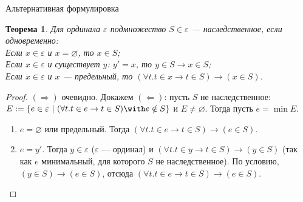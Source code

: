 \documentclass[aspectratio=169]{beamer}
\newtheorem{thm}{Теорема}[section]
\begin{document}
\begin{frame}{Альтернативная формулировка}
\begin{thm}Для ординала $\varepsilon$ подмножество $S \in \varepsilon$ --- наследственное, %
если одновременно:\\
Если $x \in \varepsilon$ и $x = \varnothing$, то $x \in S$;\\
Если $x \in \varepsilon$ и существует $y$: $y' = x$, то $y \in S \rightarrow x \in S$;\\
Если $x \in \varepsilon$ и $x$ --- предельный, то $(\forall t.t \in x \rightarrow t \in S) \rightarrow (x \in S)$.
\end{thm}

\begin{proof}$(\Rightarrow)$ очевидно. \pause Докажем $(\Leftarrow)$: пусть $S$ не наследственное: 
$E := \{e \in \varepsilon \ |\  (\forall t.t \in e \rightarrow t \in S) \with e \notin S \}$
и $E \ne \varnothing$. Тогда пусть $e = \min E$. %

\begin{enumerate}
\item $e = \varnothing$ или предельный. Тогда $(\forall t.t \in e \rightarrow t \in S) \rightarrow (e \in S)$.
\item $e = y'$. Тогда $y \in \varepsilon$ ($\varepsilon$ --- ординал) и 
$(\forall t.t \in y \rightarrow t \in S) \rightarrow (y \in S)$ (так как $e$ минимальный, для которого $S$ не наследственное). \pause
По условию, $(y \in S) \rightarrow (e \in S)$, отсюда $(\forall t.t \in e \rightarrow t \in S) \rightarrow (e \in S)$.

\begin{center}\end{center}

\end{enumerate}\vspace{-0.3cm}
\end{proof}

\end{frame}
\end{document}
